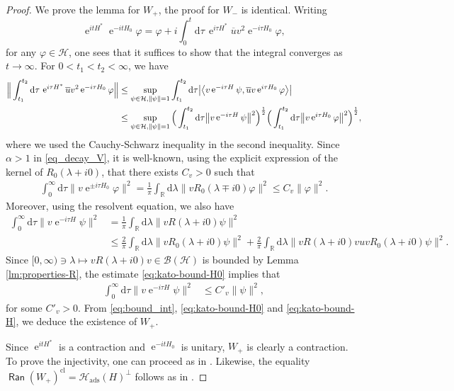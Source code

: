 \documentclass{article}
\def\B{\mathscr B}
\def\d{\mathrm{d}}
\def\H{\mathcal H}
\def\R{\mathbb R}
\def\e{\mathop{\mathrm{e}}\nolimits}
\def\Ran{\mathop{\mathsf{Ran}}\nolimits}
\def\cl{{\mathrm{cl}}}
\def\ads{{\mathrm{ads}}}
\begin{document}
\begin{proof}
We prove the lemma for $W_+$, the proof for $W_-$ is identical.
Writing
\begin{equation*}
\e^{itH^*}\e^{-itH_0}\varphi=\varphi+i\int_0^t\d\tau\, \e^{i\tau H^*}\overline{u}v^2\e^{-i\tau H_0}\varphi,
\end{equation*}
for any $\varphi\in \H$, one sees that it suffices to show that the integral converges as $t\to\infty$. For $0<t_1<t_2<\infty$, we have
\begin{align}
\Big\|\int_{t_1}^{t_2}\d\tau\, \e^{i\tau H^*}\overline{u}v^2\e^{-i\tau H_0}\varphi\Big\|&
\le\sup_{\psi\in\H,\|\psi\|=1} \int_{t_1}^{t_2}\d\tau\big|\big\langle v\e^{-i\tau H}\psi,\overline{u}v\e^{i\tau H_0}\varphi\big\rangle\big|\notag\\
&\le\sup_{\psi\in\H,\|\psi\|=1}\Big(\int_{t_1}^{t_2}\d\tau\big\|v\e^{-i\tau H}\psi\big\|^2\Big)^{\frac12}\Big(\int_{t_1}^{t_2}\d\tau
\big\|v\e^{i\tau H_0}\varphi\big\|^2\Big)^{\frac12},\label{eq:bound_int}
\end{align}
where we used the Cauchy-Schwarz inequality in the second inequality. Since $\alpha >1$ in \eqref{eq_decay_V}, it is well-known, 
using the explicit expression of the kernel of $R_0(\lambda+i0)$, that there exists $C_v>0$ such that
\begin{align}\label{eq:kato-bound-H0}
\int_{0}^\infty \d \tau \|v\e^{\pm i\tau H_0}\varphi\|^2=\frac{1}{\pi}\int_{\R} \d \lambda \|vR_0(\lambda\mp i0)\varphi\|^2 \le C_v\|\varphi\|^2.
\end{align}
Moreover, using the resolvent equation, we also have
\begin{align*}
\int_{0}^\infty \d \tau \|v \e^{-i\tau H}\psi\|^2&=\frac{1}{\pi}\int_{\R} \d \lambda \|vR(\lambda+i0)\psi\|^2 \\
&\le \frac{2}{\pi}\int_{\R} \d \lambda \|vR_0(\lambda+i0)\psi\|^2 + \frac{2}{\pi}\int_{\R} \d \lambda \|vR(\lambda+i0)v u vR_0(\lambda+i0) \psi\|^2 .
\end{align*}
Since $[0,\infty)\ni\lambda\mapsto vR(\lambda+i0)v\in\B(\H)$ is bounded by Lemma \ref{lm:properties-R},  
the estimate \eqref{eq:kato-bound-H0} implies that
\begin{align}\label{eq:kato-bound-H}
\int_{0}^\infty \d \tau \|v \e^{-i\tau H}\psi\|^2&\le C'_v\|\psi\|^2,
\end{align}
for some $C'_v>0$. 
From \eqref{eq:bound_int}, \eqref{eq:kato-bound-H0} and \eqref{eq:kato-bound-H}, 
we deduce the existence of $W_+$.

Since $\e^{itH^*}$ is a contraction and $\e^{-itH_0}$ is unitary, $W_+$ is clearly a contraction. 
To prove the injectivity, one can proceed as in \cite[Prop. 3.4]{FaFr18}. 
Likewise, the equality $\Ran(W_+)^{\cl}=\H_\ads(H)^\perp$ follows as in \cite[Prop. 3.5]{FaFr18}. 
\end{proof}
\end{document}
